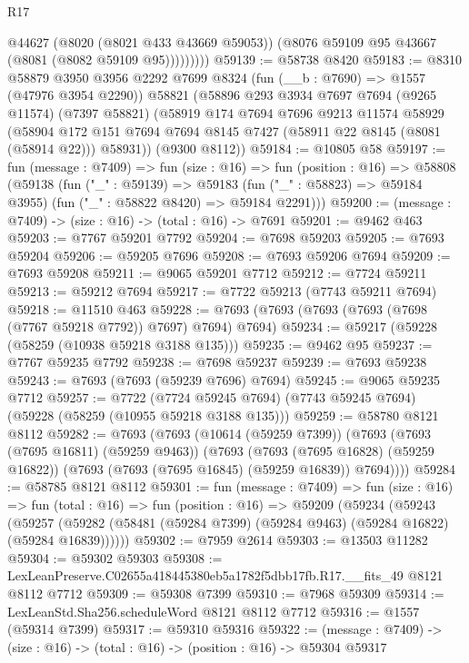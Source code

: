 \begin{lexlean}{R17}
\begin{coremodule}
                @44627
                (@8020 (@8021 @433 @43669 @59053))
                (@8076 @59109 @95 @43667 (@8081 (@8082 @59109 @95)))))))))
@59139 := @58738 @8420
@59183 := @8310
    @58879
    @3950
    @3956
    @2292
    @7699
    @8324
    (fun (__b : @7690) => @1557 (@47976 @3954 @2290))
    @58821
    (@58896
      @293
      @3934
      @7697
      @7694
      (@9265 @11574)
      (@7397 @58821)
      (@58919
        @174
        @7694
        @7696
        @9213
        @11574
        @58929
        (@58904 @172 @151 @7694 @7694 @8145 @7427 (@58911 @22 @8145 (@8081 (@58914 @22))) @58931))
      (@9300 @8112))
@59184 := @10805 @58
@59197 := fun (message : @7409) =>
  fun (size : @16) =>
  fun (position : @16) =>
  @58808
    (@59138
      (fun ("_" : @59139) =>
      @59183 (fun ("_" : @58823) => @59184 @3955) (fun ("_" : @58822 @8420) => @59184 @2291)))
@59200 := (message : @7409) -> (size : @16) -> (total : @16) -> @7691
@59201 := @9462 @463
@59203 := @7767 @59201 @7792
@59204 := @7698 @59203
@59205 := @7693 @59204
@59206 := @59205 @7696
@59208 := @7693 @59206 @7694
@59209 := @7693 @59208
@59211 := @9065 @59201 @7712
@59212 := @7724 @59211
@59213 := @59212 @7694
@59217 := @7722 @59213 (@7743 @59211 @7694)
@59218 := @11510 @463
@59228 := @7693 (@7693 (@7693 (@7693 (@7698 (@7767 @59218 @7792)) @7697) @7694) @7694)
@59234 := @59217 (@59228 (@58259 (@10938 @59218 @3188 @135)))
@59235 := @9462 @95
@59237 := @7767 @59235 @7792
@59238 := @7698 @59237
@59239 := @7693 @59238
@59243 := @7693 (@7693 (@59239 @7696) @7694)
@59245 := @9065 @59235 @7712
@59257 := @7722
    (@7724 @59245 @7694)
    (@7743 @59245 @7694)
    (@59228 (@58259 (@10955 @59218 @3188 @135)))
@59259 := @58780 @8121 @8112
@59282 := @7693
    (@7693
      (@10614 (@59259 @7399))
      (@7693
        (@7693 (@7695 @16811) (@59259 @9463))
        (@7693
          (@7693 (@7695 @16828) (@59259 @16822))
          (@7693 (@7693 (@7695 @16845) (@59259 @16839)) @7694))))
@59284 := @58785 @8121 @8112
@59301 := fun (message : @7409) =>
  fun (size : @16) =>
  fun (total : @16) =>
  fun (position : @16) =>
  @59209
    (@59234
      (@59243
        (@59257 (@59282 (@58481 (@59284 @7399) (@59284 @9463) (@59284 @16822) (@59284 @16839))))))
@59302 := @7959 @2614
@59303 := @13503 @11282
@59304 := @59302 @59303
@59308 := LexLeanPreserve.C02655a418445380eb5a1782f5dbb17fb.R17.__fits_49 @8121 @8112 @7712
@59309 := @59308 @7399
@59310 := @7968 @59309
@59314 := LexLeanStd.Sha256.scheduleWord @8121 @8112 @7712
@59316 := @1557 (@59314 @7399)
@59317 := @59310 @59316
@59322 := (message : @7409) -> (size : @16) -> (total : @16) -> (position : @16) -> @59304 @59317

\end{coremodule}
\end{lexlean}

